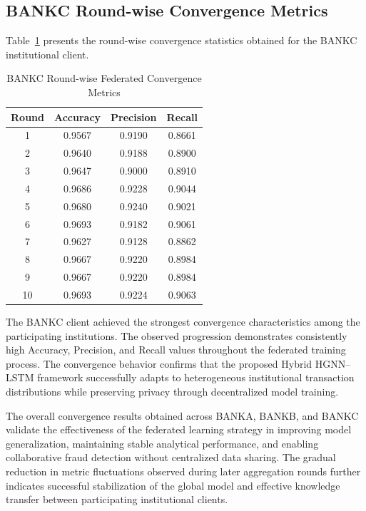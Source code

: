 \subsection{BANKC Round-wise Convergence Metrics}

Table~\ref{tab:bankc_round_metrics} presents the round-wise convergence statistics obtained for the BANKC institutional client.

\begin{table}[H]
\centering
\caption{BANKC Round-wise Federated Convergence Metrics}
\label{tab:bankc_round_metrics}
\renewcommand{\arraystretch}{1.2}
\vspace{0.2cm}
\begin{tabular}{|c|c|c|c|}
\hline
\textbf{Round} & \textbf{Accuracy} & \textbf{Precision} & \textbf{Recall} \\
\hline
1 & 0.9567 & 0.9190 & 0.8661 \\
2 & 0.9640 & 0.9188 & 0.8900 \\
3 & 0.9647 & 0.9000 & 0.8910 \\
4 & 0.9686 & 0.9228 & 0.9044 \\
5 & 0.9680 & 0.9240 & 0.9021 \\
6 & 0.9693 & 0.9182 & 0.9061 \\
7 & 0.9627 & 0.9128 & 0.8862 \\
8 & 0.9667 & 0.9220 & 0.8984 \\
9 & 0.9667 & 0.9220 & 0.8984 \\
10 & 0.9693 & 0.9224 & 0.9063 \\
\hline
\end{tabular}
\end{table}

The BANKC client achieved the strongest convergence characteristics among the participating institutions. The observed progression demonstrates consistently high Accuracy, Precision, and Recall values throughout the federated training process. The convergence behavior confirms that the proposed Hybrid HGNN--LSTM framework successfully adapts to heterogeneous institutional transaction distributions while preserving privacy through decentralized model training.

The overall convergence results obtained across BANKA, BANKB, and BANKC validate the effectiveness of the federated learning strategy in improving model generalization, maintaining stable analytical performance, and enabling collaborative fraud detection without centralized data sharing. The gradual reduction in metric fluctuations observed during later aggregation rounds further indicates successful stabilization of the global model and effective knowledge transfer between participating institutional clients.
